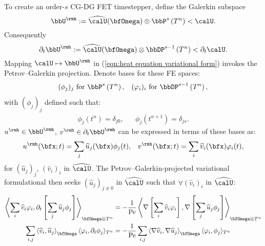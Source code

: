 \begin{example}
      To create an order-$s$ CG-DG FET timestepper, define the Galerkin subspace
      \begin{equation}
          \bbU^{\rmh}  :=  \widehat{\calU}(\bfOmega)\otimes\bbP^{s}\left(T^{n}\right)  <  \calU.
      \end{equation}
      Consequently
      \begin{equation}
          \partial_{t}\bbU^{\rmh}  :=  \widehat{\calU}(\bfOmega)\otimes\bbDP^{s - 1}\left(T^{n}\right)  <  \partial_{t}\calU.
      \end{equation}
      Mapping $\calU  \mapsto  \bbU^{\rmh}$ in (\ref{eqn:heat equation variational form}) invokes the Petrov--Galerkin projection. Denote bases for these FE spaces:
      \begin{align}
          (\phi_{j})_{j}     \text{ for }  \bbP^{s}\left(T^{n}\right),         &&
          (\varphi_{i})_{i}  \text{ for }  \bbDP^{s - 1}\left(T^{n}\right),
      \end{align}
      with $(\phi_{j})_{j}$ defined such that:
      \begin{align}
          \phi_{j}\left(t^{n}\right)      =  \delta_{j0},  &&
          \phi_{j}\left(t^{n + 1}\right)  =  \delta_{js}.
      \end{align}
      $u^{\rmh}  \in  \bbU^{\rmh}$, $v^{\rmh}  \in  \partial_{t}\bbU^{\rmh}$ can be expressed in terms of these bases as:
      \begin{align}
          u^{\rmh}(\bfx; t)  =  \sum_{j}\widehat{u}_{j}(\bfx)\phi_{j}(t),  &&
          v^{\rmh}(\bfx; t)  =  \sum_{i}\widehat{v}_{i}(\bfx)\varphi_{i}(t),
      \end{align}
      for $\left(\widehat{u}_{j}\right)_{j}$, $\left(\widehat{v}_{i}\right)_{i}$ in $\widehat{\calU}$. The Petrov--Galerkin-projected variational formulational then seeks $\left(\widehat{u}_{j}\right)_{j \neq 0}$ in $\widehat{\calU}$ such that $\forall  \left(\widehat{v}_{i}\right)_{i}$ in $\widehat{\calU}$:
      \begin{align}
          \left\langle\sum_{i}\widehat{v}_{i}\varphi_{i}, \partial_{t}\left[\sum_{j}\widehat{u}_{j}\phi_{j}\right]\right\rangle_{\bfOmega\otimes T^{n}}  &=  - \frac{1}{\rmPe}\left\langle\nabla\left[\sum_{i}\widehat{v}_{i}\varphi_{i}\right], \nabla\left[\sum_{j}\widehat{u}_{j}\phi_{j}\right]\right\rangle_{\bfOmega\otimes T^{n}}  \\
          \sum_{i, j}\left\langle\widehat{v}_{i}, \widehat{u}_{j}\right\rangle_{\bfOmega}\langle\varphi_{i}, \partial_{t}\phi_{j}\rangle_{T^{n}}  &=  - \frac{1}{\rmPe}\sum_{i, j}\left\langle\nabla\widehat{v}_{i}, \nabla\widehat{u}_{j}\right\rangle_{\bfOmega}\langle\varphi_{i}, \phi_{j}\rangle_{T^{n}}

\end{align}
\end{example}
